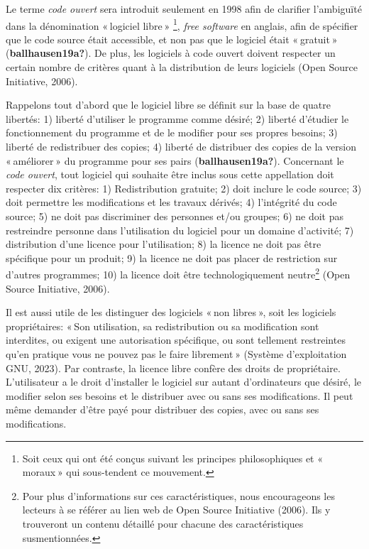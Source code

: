 \documentclass[
  letterpaper,
  DIV=11,
  numbers=noendperiod]{scrreprt}
\begin{document}
Le terme \emph{code ouvert} sera introduit seulement en 1998 afin de
clarifier l'ambiguïté dans la dénomination « logiciel libre »
\footnote{Soit ceux qui ont été conçus suivant les principes
  philosophiques et « moraux » qui sous-tendent ce mouvement.},
\emph{free software} en anglais, afin de spécifier que le code source
était accessible, et non pas que le logiciel était « gratuit »
(\textbf{ballhausen19a?}). De plus, les logiciels à code ouvert doivent
respecter un certain nombre de critères quant à la distribution de leurs
logiciels (Open Source Initiative, 2006).

Rappelons tout d'abord que le logiciel libre se définit sur la base de
quatre libertés: 1) liberté d'utiliser le programme comme désiré; 2)
liberté d'étudier le fonctionnement du programme et de le modifier pour
ses propres besoins; 3) liberté de redistribuer des copies; 4) liberté
de distribuer des copies de la version « améliorer » du programme pour
ses pairs (\textbf{ballhausen19a?}). Concernant le \emph{code ouvert},
tout logiciel qui souhaite être inclus sous cette appellation doit
respecter dix critères: 1) Redistribution gratuite; 2) doit inclure le
code source; 3) doit permettre les modifications et les travaux dérivés;
4) l'intégrité du code source; 5) ne doit pas discriminer des personnes
et/ou groupes; 6) ne doit pas restreindre personne dans l'utilisation du
logiciel pour un domaine d'activité; 7) distribution d'une licence pour
l'utilisation; 8) la licence ne doit pas être spécifique pour un
produit; 9) la licence ne doit pas placer de restriction sur d'autres
programmes; 10) la licence doit être technologiquement neutre\footnote{Pour
  plus d'informations sur ces caractéristiques, nous encourageons les
  lecteurs à se référer au lien web de Open Source Initiative (2006).
  Ils y trouveront un contenu détaillé pour chacune des caractéristiques
  susmentionnées.} (Open Source Initiative, 2006).

Il est aussi utile de les distinguer des logiciels « non libres », soit
les logiciels propriétaires: « Son utilisation, sa redistribution ou sa
modification sont interdites, ou exigent une autorisation spécifique, ou
sont tellement restreintes qu'en pratique vous ne pouvez pas le faire
librement » (Système d'exploitation GNU, 2023). Par contraste, la
licence libre confère des droits de propriétaire. L'utilisateur a le
droit d'installer le logiciel sur autant d'ordinateurs que désiré, le
modifier selon ses besoins et le distribuer avec ou sans ses
modifications. Il peut même demander d'être payé pour distribuer des
copies, avec ou sans ses modifications.
\end{document}
